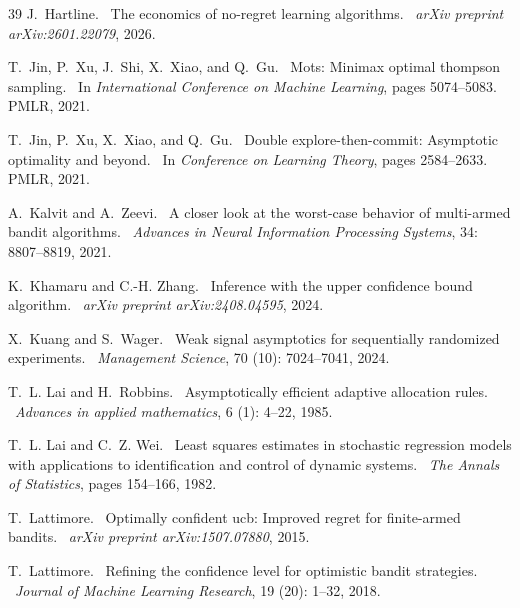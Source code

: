 \documentclass[nonblindrev]{informs3_noinforms}
\def\newblock{\ }%
\begin{document}
\begin{thebibliography}{39}
J.~Hartline.
\newblock The economics of no-regret learning algorithms.
\newblock \emph{arXiv preprint arXiv:2601.22079}, 2026.

T.~Jin, P.~Xu, J.~Shi, X.~Xiao, and Q.~Gu.
\newblock Mots: Minimax optimal thompson sampling.
\newblock In \emph{International Conference on Machine Learning}, pages 5074--5083. PMLR, 2021{}.

T.~Jin, P.~Xu, X.~Xiao, and Q.~Gu.
\newblock Double explore-then-commit: Asymptotic optimality and beyond.
\newblock In \emph{Conference on Learning Theory}, pages 2584--2633. PMLR, 2021{}.

A.~Kalvit and A.~Zeevi.
\newblock A closer look at the worst-case behavior of multi-armed bandit algorithms.
\newblock \emph{Advances in Neural Information Processing Systems}, 34: 8807--8819, 2021.

K.~Khamaru and C.-H. Zhang.
\newblock Inference with the upper confidence bound algorithm.
\newblock \emph{arXiv preprint arXiv:2408.04595}, 2024.

X.~Kuang and S.~Wager.
\newblock Weak signal asymptotics for sequentially randomized experiments.
\newblock \emph{Management Science}, 70 (10): 7024--7041, 2024.

T.~L. Lai and H.~Robbins.
\newblock Asymptotically efficient adaptive allocation rules.
\newblock \emph{Advances in applied mathematics}, 6 (1): 4--22, 1985.

T.~L. Lai and C.~Z. Wei.
\newblock Least squares estimates in stochastic regression models with applications to identification and control of dynamic systems.
\newblock \emph{The Annals of Statistics}, pages 154--166, 1982.

T.~Lattimore.
\newblock Optimally confident ucb: Improved regret for finite-armed bandits.
\newblock \emph{arXiv preprint arXiv:1507.07880}, 2015.

T.~Lattimore.
\newblock Refining the confidence level for optimistic bandit strategies.
\newblock \emph{Journal of Machine Learning Research}, 19 (20): 1--32, 2018.


\end{thebibliography}
\end{document}
